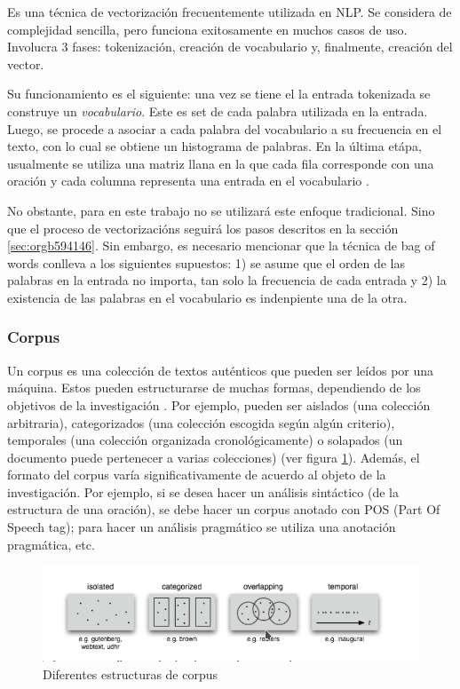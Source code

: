 \documentclass[12pt,letterpaper,twoside]{article}
\begin{document}
Es una técnica de vectorización frecuentemente utilizada en NLP.
Se considera de complejidad sencilla, pero funciona exitosamente
en muchos casos de uso. Involucra 3 fases: tokenización, creación de vocabulario y,
finalmente, creación del vector.

Su funcionamiento es el siguiente: una vez se tiene el la entrada
tokenizada se construye un \emph{vocabulario}.  Este es set de cada
palabra utilizada en la entrada.  Luego, se procede a asociar a
cada palabra del vocabulario a su frecuencia en el texto, con lo
cual se obtiene un histograma de palabras. En la última etápa,
usualmente se utiliza una matriz llana en la que cada fila
corresponde con una oración y cada columna representa una entrada
en el vocabulario \cite{jha_abhishek_vectorization}.

No obstante, para en este trabajo no se utilizará este enfoque
tradicional.  Sino que el proceso de vectorizacións seguirá los
pasos descritos en la sección \ref{sec:orgb594146}. Sin embargo,
es necesario mencionar que la técnica de bag of words conlleva
a los siguientes supuestos: 1) se asume que el orden de las
palabras en la entrada no importa, tan solo la frecuencia
de cada entrada y 2) la existencia de las palabras en el
vocabulario es indenpiente una de la otra.  
\subsubsection{Corpus}
\label{sec:orgc03338e}


Un corpus es una colección de textos auténticos que pueden ser
leídos por una máquina. Estos pueden estructurarse de muchas
formas, dependiendo de los objetivos de la investigación
\cite{indurkhya2010handbook}. Por ejemplo, pueden ser aislados (una
colección arbitraria), categorizados (una colección escogida según
algún criterio), temporales (una colección organizada
cronológicamente) o solapados (un documento puede pertenecer a
varias colecciones) \cite{bird2009natural} (ver figura
\ref{fig:org66b4290}). Además, el formato del corpus varía
significativamente de acuerdo al objeto de la investigación. Por
ejemplo, si se desea hacer un análisis sintáctico (de la estructura
de una oración), se debe hacer un corpus anotado con POS (Part Of
Speech tag); para hacer un análisis pragmático se utiliza una
anotación pragmática, etc.



\begin{figure}[htbp]
\centering
\includegraphics[width=.9\linewidth]{./assets/estructuras_de_corpus.png}
\caption{\label{fig:org66b4290}Diferentes estructuras de corpus}
\end{figure}
\end{document}
